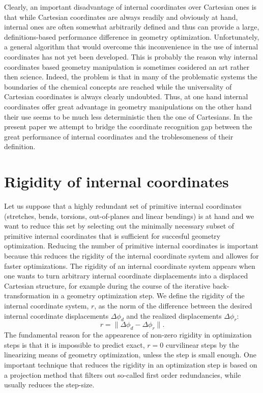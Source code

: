 \documentclass[prl,aps,preprint,superbib,12pt]{revtex4}
\begin{document}
Clearly, an important disadvantage of internal coordinates 
over Cartesian ones
is that while Cartesian coordinates are always readily and
obviously at hand,
internal ones are often somewhat arbitrarily defined and thus
can provide a large, definitions-based performance difference
in geometry optimization. 
Unfortunately,
a general algorithm that would overcome this inconvenience in the use
of internal coordinates has not yet been developed. This is probably
the reason why internal coordinates based geometry manipulation
is sometimes cosidered an art rather then science.
Indeed, the problem is that in many of the
problematic systems the boundaries of the chemical concepts are 
reached while the universality of Cartesian coordinates is always 
clearly undoubted. Thus, at one hand internal coordinates offer
great advantage in geometry manipulations on the other hand their
use seems to be much less deterministic then the one of Cartesians.
In the present paper we attempt to bridge the coordinate recognition
gap between the great performance of internal coordinates and the 
troblesomeness of their definition.

\section{Rigidity of internal coordinates}
Let us suppose that a highly redundant set of primitive
internal coordinates (stretches, bends, torsions, out-of-planes
and linear bendings) is
at hand and we want to reduce this set 
by selecting out the minimally necessary subset of 
primitive internal coordinates that is sufficient for succesful
geometry optimization.
Reducing the number of primitive internal coordinates
is important because this reduces the rigidity of the internal 
coordinate system and allowes for faster optimizations.
The rigidity of an internal coordinate system appears when
one wants to turn arbitrary internal coordinate displacements
into a displaced Cartesian structure, for example
during the course of the iterative back-transformation 
\cite{PPulay77} in a geometry optimization step. 
We define the rigidity of the internal coordinate system, $r$, 
as the norm of the difference between the desired internal coordinate 
displacements $\Delta \phi_{d}$ 
and the realized displacements $\Delta \phi_{r}$: 
\begin{equation}
r = \| \Delta \phi_{d} - \Delta \phi_{r} \| .
\end{equation}
The fundamental reason for the appearence of non-zero
rigidity in optimization steps is 
that it is impossible to predict exact, $r=0$ curvilinear
steps by the linearizing means of geometry optimization, unless
the step is small enough. One important technique 
that reduces the rigidity in an optimization step
is based on a projection method \cite{PPulay92} that filters out
so-called first order redundancies, while usually reduces 
the step-size.
\end{document}
